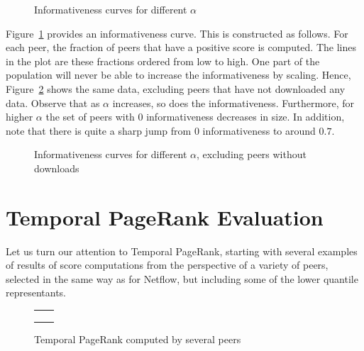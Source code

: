\documentclass[a4paper,11pt]{book}
\theoremstyle{definition}
\begin{document}
\begin{figure}[ht]
    \centering
    
    \caption{Informativeness curves for different $\alpha$}
    \label{fig:info}
\end{figure}

Figure~\ref{fig:info} provides an informativeness curve. This is constructed as follows. For each
peer, the fraction of peers that have a positive score is computed. The lines in the plot
are these fractions ordered from low to high. One part of the population will never be able
to increase the informativeness by scaling. Hence, Figure~\ref{fig:info_filter} shows the same
data, excluding peers that have not downloaded any data. Observe that as $\alpha$ increases,
so does the informativeness. Furthermore, for higher $\alpha$ the set of peers with $0$ 
informativeness decreases in size. In addition, note that there is quite a sharp jump from 
$0$ informativeness to around $0.7$.

\begin{figure}[ht]
    \centering
    
    \caption{Informativeness curves for different $\alpha$, excluding peers without downloads}
    \label{fig:info_filter}
\end{figure}

\section{Temporal PageRank Evaluation}

Let us turn our attention to Temporal PageRank, starting with several examples of results of
score computations from the perspective of a variety of peers, selected in the same way as for
Netflow, but including some of the lower quantile representants.

\begin{figure}[ht]
    \centering
    \begin{tabular}[ht]{cc}
         &
         \\
         &
         \\

         &
         \\
    \end{tabular}
    \caption{Temporal PageRank computed by several peers}
    \label{fig:tpr_per_peer_1}
\end{figure}
\end{document}
